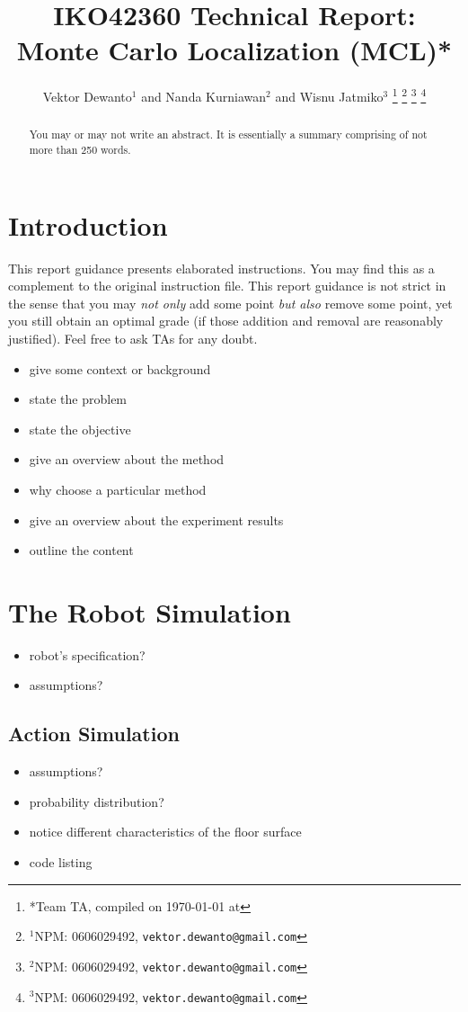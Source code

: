 \documentclass[letterpaper, 10 pt, conference]{ieeeconf}  %
\title{\LARGE \bf
IKO42360 Technical Report: Monte Carlo Localization (MCL)*
}
\author{Vektor Dewanto$^{1}$ and Nanda Kurniawan$^{2}$ and Wisnu Jatmiko$^{3}$  %
\thanks{*Team TA, compiled on {\ddmmyyyydate\today} at \currenttime}%
\thanks{$^{1}$NPM: 0606029492,
        {\tt\small vektor.dewanto@gmail.com}}%
\thanks{$^{2}$NPM: 0606029492,
        {\tt\small vektor.dewanto@gmail.com}}%
\thanks{$^{3}$NPM: 0606029492,
        {\tt\small vektor.dewanto@gmail.com}}%
}
\begin{document}
\maketitle
\thispagestyle{empty}
\pagestyle{empty}

\begin{abstract}
You may or may not write an abstract.
It is essentially a summary comprising of not more than 250 words.
\end{abstract}

\section{Introduction}
This report guidance presents elaborated instructions.
You may find this as a complement to the original instruction file.
This report guidance is not strict in the sense that you may \emph{not only} add some point \emph{but also} remove some point, yet you still obtain an optimal grade (if those addition and removal are reasonably justified).
Feel free to ask TAs for any doubt.

\begin{itemize}
    \item give some context or background
    \item state the problem
    \item state the objective
    \item give an overview about the method
    \item why choose a particular method
    \item give an overview about the experiment results
    \item outline the content
\end{itemize}

\section{The Robot Simulation}
\begin{itemize}
    \item robot's specification?
    \item assumptions?
\end{itemize}

\subsection{Action Simulation}
\begin{itemize}
    \item assumptions?
    \item probability distribution?
    \item notice different characteristics of the floor surface 
    \item code listing
\end{itemize}
\end{document}
